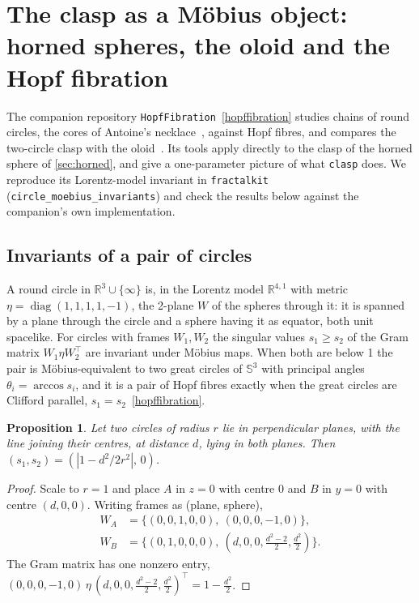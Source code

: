 \documentclass[11pt,a4paper]{article}
\newtheorem{proposition}{Proposition}
\theoremstyle{remark}
\newcommand{\R}{\mathbb{R}}
\newcommand{\Sph}{\mathbb{S}}
\newcommand{\code}[1]{\texttt{#1}}
\begin{document}
\section{The clasp as a M\"obius object: horned spheres, the oloid and the Hopf fibration}
\label{sec:clasp}

The companion repository \code{HopfFibration}~\ref{hopffibration} studies chains of round circles, the cores of Antoine's necklace~\cite{wiki_antoine,schwartz2022}, against Hopf fibres, and compares the two-circle clasp with the oloid~\cite{wiki_oloid}.  Its tools apply directly to the clasp of the horned sphere of \cref{sec:horned}, and give a one-parameter picture of what \code{clasp} does.  We reproduce its Lorentz-model invariant in \code{fractalkit} (\code{circle\_moebius\_invariants}) and check the results below against the companion's own implementation.

\subsection{Invariants of a pair of circles}

A round circle in $\R^3\cup\{\infty\}$ is, in the Lorentz model $\R^{4,1}$ with metric $\eta=\operatorname{diag}(1,1,1,1,-1)$, the 2-plane $W$ of the spheres through it: it is spanned by a plane through the circle and a sphere having it as equator, both unit spacelike.  For circles with frames $W_1,W_2$ the singular values $s_1\ge s_2$ of the Gram matrix $W_1\eta W_2^{\top}$ are invariant under M\"obius maps.  When both are below 1 the pair is M\"obius-equivalent to two great circles of $\Sph^3$ with principal angles $\theta_i=\arccos s_i$, and it is a pair of Hopf fibres exactly when the great circles are Clifford parallel, $s_1=s_2$~\ref{hopffibration}.

\begin{proposition}\label{prop:clasp}
Let two circles of radius $r$ lie in perpendicular planes, with the line joining their centres, at distance $d$, lying in both planes.  Then $(s_1,s_2)=(|1-d^2/2r^2|,\,0)$.
\end{proposition}
\begin{proof}
Scale to $r=1$ and place $A$ in $z=0$ with centre $0$ and $B$ in $y=0$ with centre $(d,0,0)$.  Writing frames as (plane, sphere),
\begin{align*}
W_A&=\{(0,0,1,0,0),\ (0,0,0,-1,0)\},\\
W_B&=\{(0,1,0,0,0),\ (d,0,0,\tfrac{d^2-2}{2},\tfrac{d^2}{2})\}.
\end{align*}
The Gram matrix has one nonzero entry, $(0,0,0,-1,0)\,\eta\,(d,0,0,\tfrac{d^2-2}{2},\tfrac{d^2}{2})^{\top}=1-\tfrac{d^2}{2}$.
\end{proof}
\end{document}
